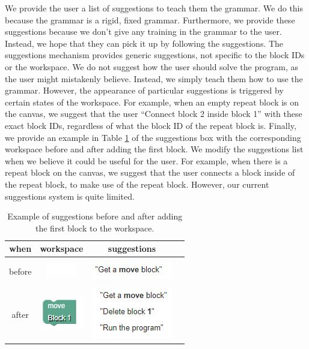 \documentclass[]{article}
\begin{document}
We provide the user a list of suggestions to teach them the grammar. We do this because the grammar is a rigid, fixed grammar. Furthermore, we provide these suggestions because we don't give any training in the grammar to the user. Instead, we hope that they can pick it up by following the suggestions. The suggestions mechanism provides generic suggestions, not specific to the block IDs or the workspace. We do not suggest how the user should solve the program, as the user might mistakenly believe. Instead, we simply teach them how to use the grammar. However, the appearance of particular suggestions is triggered by certain states of the workspace. For example, when an empty repeat block is on the canvas, we suggest that the user ``Connect block 2 inside block 1'' with these exact block IDs, regardless of what the block ID of the repeat block is. Finally, we provide an example in Table \ref{SuggestionsBeforeAndAfter} of the suggestions box with the corresponding workspace before and after adding the first block. We modify the suggestions list when we believe it could be useful for the user. For example, when there is a repeat block on the canvas, we suggest that the user connects a block inside of the repeat block, to make use of the repeat block. However, our current suggestions system is quite limited.\\
\begin{table}
	\caption{Example of suggestions before and after adding the first block to the workspace.}
	\label{SuggestionsBeforeAndAfter}
	\begin{tabular}{cccc}
		\hline
		when & workspace & suggestions \\\hline
		\\
		before & \includegraphics{suggestions_before_workspace.jpg} & \includegraphics{suggestions_before.jpg} \\\hline
		\\
		after & \includegraphics{suggestions_after_workspace.jpg} & \includegraphics{suggestions_after.jpg} \\\hline
	\end{tabular}
\end{table}
\end{document}
